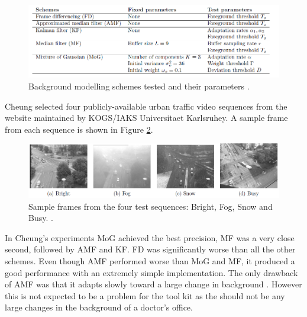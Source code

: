 \begin{figure}[h]
\begin{center}
\includegraphics[scale=0.4]{./research/schemes} 
\end{center}
\caption{Background modelling schemes tested and their parameters \cite{Cheung2007}.}
\label{fig:background modelling schemes tested and their parameters}
\end{figure}

Cheung \cite{Cheung2007} selected four publicly-available urban traffic video sequences from the website maintained by KOGS/IAKS Universitaet Karlsruhey. A sample frame from each sequence is shown in Figure \ref{fig:sample frames from the four test sequences: Bright, Fog, Snow and Busy}.\\ 

\begin{figure}[h]
\begin{center}
\includegraphics[scale=0.4]{./research/samples} 
\end{center}
\caption{Sample frames from the four test sequences: Bright, Fog, Snow and Busy. \cite{Cheung2007}.}
\label{fig:sample frames from the four test sequences: Bright, Fog, Snow and Busy}
\end{figure}

In Cheung's experiments \cite{Cheung2007} MoG achieved the best precision, MF was a very close second, followed by AMF and KF. FD was significantly worse than all the other schemes. Even though AMF performed worse than MoG and MF, it produced a good performance with an extremely simple implementation. The only drawback of AMF was that it adapts slowly toward a large change in background \cite{Cheung2007}. However this is not expected to be a problem for the tool kit as the should not be any large changes in the background of a doctor's office.\\

